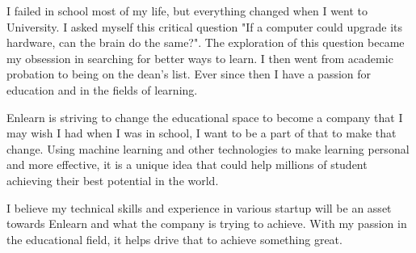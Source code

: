 \documentclass[11pt, a4paper]{awesome-cv} %
\begin{document}
\makecvheader %

\makelettertitle %


\begin{cvletter}



I failed in school most of my life, but everything changed when I went to University.  I asked myself this critical question "If a computer could upgrade its hardware, can the brain do the same?".  The exploration of this question became my obsession in searching for better ways to learn.  I then went from academic probation to being on the dean's list.    Ever since then I have a passion for education and in the fields of learning.  



Enlearn is striving to change the educational space to become a company that I may wish I had when I was in school, I want to be a part of that to make that change.  Using machine learning and other technologies to make learning personal and more effective, it is a unique idea that could help millions of student achieving their best potential in the world.



I believe my technical skills and experience in various startup will be an asset towards Enlearn and what the company is trying to achieve.  With my passion in the educational field, it helps drive that to achieve something great.


\end{cvletter}


\makeletterclosing %
\end{document}
